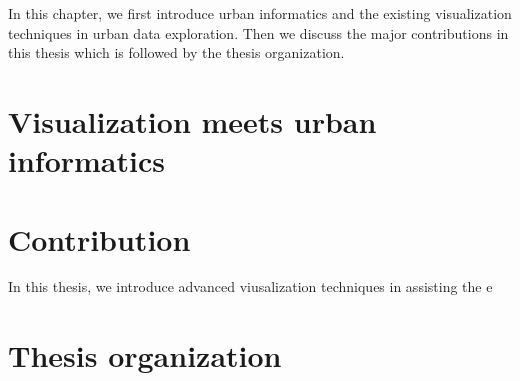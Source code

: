 In this chapter, we first introduce urban informatics and the existing visualization techniques in urban data exploration. Then we discuss the major contributions in this thesis which is followed by the thesis organization.

\section{Visualization meets urban informatics}

\section{Contribution}
In this thesis, we introduce advanced viusalization techniques in assisting the e
\section{Thesis organization}
